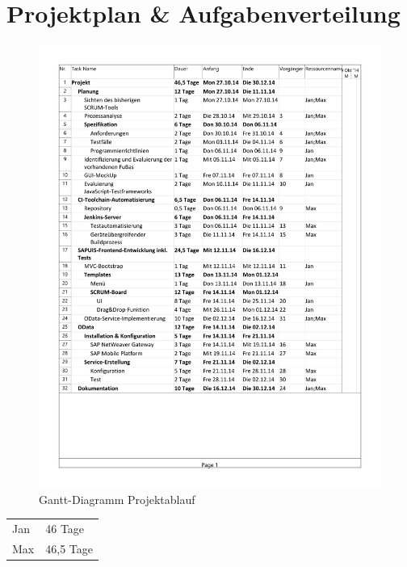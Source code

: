 \documentclass[10pt, a4paper]{article}
\begin{document}
\clearpage
\section{Projektplan \& Aufgabenverteilung}
\begin{figure}[h]
\includegraphics[trim = 13mm 60mm 31.7mm 13mm, clip, scale=0.9]{Zeitplan.pdf}
\caption{Gantt-Diagramm Projektablauf}
\label{fig:Projektablauf}
\end{figure}

\begin{tabular}{ll}
Jan & 46 Tage \\
Max & 46,5 Tage \\
\end{tabular}
\end{document}
